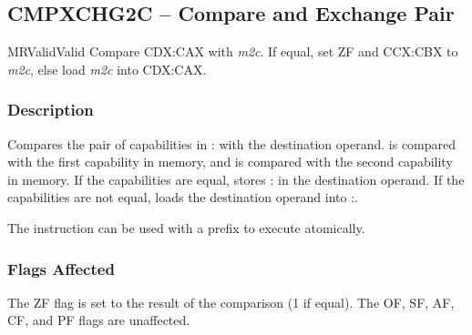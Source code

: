 \clearpage
{}
{}
\subsection*{CMPXCHG2C -- Compare and Exchange Pair}

\begin{x86opcodetable}
  {MR}{Valid}{Valid}
  {Compare CDX:CAX with \emph{m2c}. If equal, set ZF and CCX:CBX to
    \emph{m2c}, else load \emph{m2c} into CDX:CAX.}
\end{x86opcodetable}

\begin{x86opentable}
\end{x86opentable}

\subsubsection*{Description}

Compares the pair of capabilities in \CDX{}:\CAX{} with the
destination operand.  \CAX{} is compared with the first capability in
memory, and \CDX{} is compared with the second capability in memory.
If the capabilities are equal, stores \CCX{}:\CBX{} in the destination
operand.  If the capabilities are not equal, loads the destination
operand into \CDX{}:\CAX{}.

The instruction can be used with a  prefix to execute
atomically.

\subsubsection*{Flags Affected}

The ZF flag is set to the result of the comparison (1 if equal).  The
OF, SF, AF, CF, and PF flags are unaffected.
